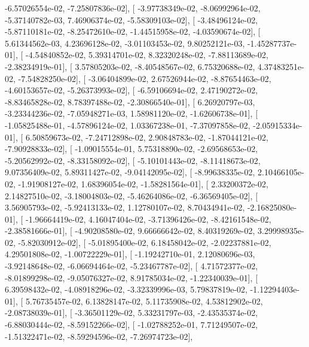 \documentclass{article}
\begin{document}
         -6.57026554e-02,  -7.25807836e-02],
       [ -3.97738349e-02,  -8.06992964e-02,  -5.37140782e-03,
          7.46906374e-02,  -5.58309103e-02],
       [ -3.48496124e-02,  -5.87110181e-02,  -8.25472610e-02,
         -1.44515958e-02,  -4.03590674e-02],
       [  5.61344562e-03,   4.23696128e-02,  -3.01103453e-02,
          9.80252121e-03,  -1.45287737e-01],
       [ -4.54840852e-02,   5.39314701e-02,   8.32320248e-02,
         -7.88113689e-02,  -2.38234919e-01],
       [  3.57805203e-02,  -8.40548567e-02,   6.75320688e-02,
          4.37483251e-02,  -7.54828250e-02],
       [ -3.06404899e-02,   2.67526944e-02,  -8.87654463e-02,
         -4.60153657e-02,  -5.26373993e-02],
       [ -6.59106694e-02,   2.47190272e-02,  -8.83465828e-02,
          8.78397488e-02,  -2.30866540e-01],
       [  6.26920797e-03,  -3.23344236e-02,  -7.05948271e-03,
          1.58981120e-02,  -1.62606738e-01],
       [ -1.05825488e-01,  -4.57896124e-02,   1.03367238e-01,
         -7.37097858e-02,  -2.05915334e-01],
       [  6.50859673e-02,  -7.24712898e-02,   2.90848783e-02,
         -1.87044121e-02,  -7.90928833e-02],
       [ -1.09015554e-01,   5.75318890e-02,  -2.69568653e-02,
         -5.20562992e-02,  -8.33158092e-02],
       [ -5.10101443e-02,  -8.11418673e-02,   9.07356409e-02,
          5.89311427e-02,  -9.04142095e-02],
       [ -8.99638335e-02,   2.10466105e-02,  -1.91908127e-02,
          1.68396054e-02,  -1.58281564e-01],
       [  2.33200372e-02,   2.14827510e-02,  -3.18004803e-02,
         -5.46264086e-02,  -6.36569405e-02],
       [  3.56905793e-02,  -5.92413133e-02,   1.12780107e-02,
          8.70434941e-02,  -2.16825080e-01],
       [ -1.96664419e-02,   4.16047404e-02,  -3.71396426e-02,
         -8.42161548e-02,  -2.38581666e-01],
       [ -4.90208580e-02,   9.66666642e-02,   8.40319269e-02,
          3.29998935e-02,  -5.82030912e-02],
       [ -5.01895400e-02,   6.18458042e-02,  -2.02237881e-02,
          4.29501808e-02,  -1.00722229e-01],
       [ -1.19242710e-01,   2.12080696e-03,  -3.92148648e-02,
         -6.06694464e-02,  -5.23467787e-02],
       [  4.71572377e-02,  -8.01899298e-02,  -9.05076327e-02,
          8.91785034e-02,  -1.22340039e-01],
       [  6.39598432e-02,  -4.08918296e-02,  -3.32339996e-03,
          5.79837819e-02,  -1.12294403e-01],
       [  5.76735457e-02,   6.13828147e-02,   5.11735908e-02,
          4.53812902e-02,  -2.08738039e-01],
       [ -3.36501129e-02,   5.33231797e-03,  -2.43535374e-02,
         -6.88030444e-02,  -8.59152266e-02],
       [ -1.02788252e-01,   7.71249507e-02,  -1.51322471e-02,
         -8.59294596e-02,  -7.26974723e-02],
\end{document}
